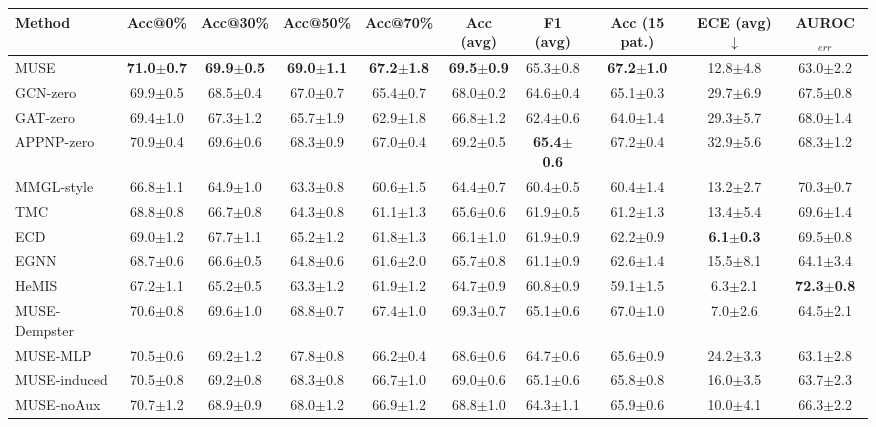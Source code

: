 \begin{tabular}{lccccccccc}
\toprule
Method & Acc@0\% & Acc@30\% & Acc@50\% & Acc@70\% & Acc (avg) & F1 (avg) & Acc (15 pat.) & ECE (avg)$\downarrow$ & AUROC$_{err}$ \\
\midrule
MUSE & \textbf{71.0$\pm$0.7} & \textbf{69.9$\pm$0.5} & \textbf{69.0$\pm$1.1} & \textbf{67.2$\pm$1.8} & \textbf{69.5$\pm$0.9} & 65.3$\pm$0.8 & \textbf{67.2$\pm$1.0} & 12.8$\pm$4.8 & 63.0$\pm$2.2 \\
GCN-zero & 69.9$\pm$0.5 & 68.5$\pm$0.4 & 67.0$\pm$0.7 & 65.4$\pm$0.7 & 68.0$\pm$0.2 & 64.6$\pm$0.4 & 65.1$\pm$0.3 & 29.7$\pm$6.9 & 67.5$\pm$0.8 \\
GAT-zero & 69.4$\pm$1.0 & 67.3$\pm$1.2 & 65.7$\pm$1.9 & 62.9$\pm$1.8 & 66.8$\pm$1.2 & 62.4$\pm$0.6 & 64.0$\pm$1.4 & 29.3$\pm$5.7 & 68.0$\pm$1.4 \\
APPNP-zero & 70.9$\pm$0.4 & 69.6$\pm$0.6 & 68.3$\pm$0.9 & 67.0$\pm$0.4 & 69.2$\pm$0.5 & \textbf{65.4$\pm$0.6} & 67.2$\pm$0.4 & 32.9$\pm$5.6 & 68.3$\pm$1.2 \\
MMGL-style & 66.8$\pm$1.1 & 64.9$\pm$1.0 & 63.3$\pm$0.8 & 60.6$\pm$1.5 & 64.4$\pm$0.7 & 60.4$\pm$0.5 & 60.4$\pm$1.4 & 13.2$\pm$2.7 & 70.3$\pm$0.7 \\
TMC & 68.8$\pm$0.8 & 66.7$\pm$0.8 & 64.3$\pm$0.8 & 61.1$\pm$1.3 & 65.6$\pm$0.6 & 61.9$\pm$0.5 & 61.2$\pm$1.3 & 13.4$\pm$5.4 & 69.6$\pm$1.4 \\
ECD & 69.0$\pm$1.2 & 67.7$\pm$1.1 & 65.2$\pm$1.2 & 61.8$\pm$1.3 & 66.1$\pm$1.0 & 61.9$\pm$0.9 & 62.2$\pm$0.9 & \textbf{6.1$\pm$0.3} & 69.5$\pm$0.8 \\
EGNN & 68.7$\pm$0.6 & 66.6$\pm$0.5 & 64.8$\pm$0.6 & 61.6$\pm$2.0 & 65.7$\pm$0.8 & 61.1$\pm$0.9 & 62.6$\pm$1.4 & 15.5$\pm$8.1 & 64.1$\pm$3.4 \\
HeMIS & 67.2$\pm$1.1 & 65.2$\pm$0.5 & 63.3$\pm$1.2 & 61.9$\pm$1.2 & 64.7$\pm$0.9 & 60.8$\pm$0.9 & 59.1$\pm$1.5 & 6.3$\pm$2.1 & \textbf{72.3$\pm$0.8} \\
\midrule
MUSE-Dempster & 70.6$\pm$0.8 & 69.6$\pm$1.0 & 68.8$\pm$0.7 & 67.4$\pm$1.0 & 69.3$\pm$0.7 & 65.1$\pm$0.6 & 67.0$\pm$1.0 & 7.0$\pm$2.6 & 64.5$\pm$2.1 \\
MUSE-MLP & 70.5$\pm$0.6 & 69.2$\pm$1.2 & 67.8$\pm$0.8 & 66.2$\pm$0.4 & 68.6$\pm$0.6 & 64.7$\pm$0.6 & 65.6$\pm$0.9 & 24.2$\pm$3.3 & 63.1$\pm$2.8 \\
MUSE-induced & 70.5$\pm$0.8 & 69.2$\pm$0.8 & 68.3$\pm$0.8 & 66.7$\pm$1.0 & 69.0$\pm$0.6 & 65.1$\pm$0.6 & 65.8$\pm$0.8 & 16.0$\pm$3.5 & 63.7$\pm$2.3 \\
MUSE-noAux & 70.7$\pm$1.2 & 68.9$\pm$0.9 & 68.0$\pm$1.2 & 66.9$\pm$1.2 & 68.8$\pm$1.0 & 64.3$\pm$1.1 & 65.9$\pm$0.6 & 10.0$\pm$4.1 & 66.3$\pm$2.2 \\

\end{tabular}
